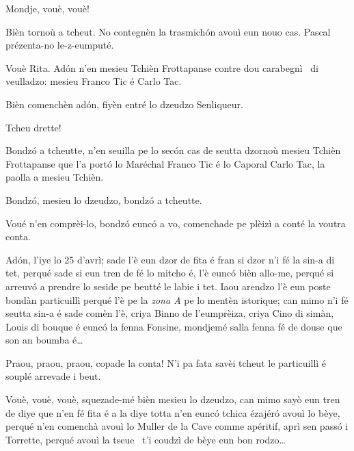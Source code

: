 \begin{drama}

 
\Ritaspeaks Mondje, vouè, vouè!


\Ritaspeaks Bièn tornoù a tcheut. No contegnèn la trasmichón avouì eun nouo cas. Pascal prézenta-no le-z-eumputé.

\Pascalspeaks Vouè Rita. Adón n'en mesieu Tchièn Frottapanse contre dou carabegnì \carabiniere\ di veulladzo: mesieu Franco Tic é Carlo Tac.


\Ritaspeaks Bièn comenchèn adón, fiyèn entré lo dzeudzo Senliqueur.


\Pascalspeaks Tcheu drette!


\DzeudzoSenliquerspeaks Bondzó a tcheutte, n'en seuilla pe lo secón cas de seutta dzornoù mesieu Tchièn Frottapanse que l'a portó lo Maréchal Franco Tic é lo Caporal Carlo Tac, la paolla a mesieu Tchièn.

\Cienspeaks Bondzó, mesieu lo dzeudzo, bondzó a tcheutte.

\DzeudzoSenliquerspeaks Voué n’en comprèi-lo, bondzó eunc\'o a vo, comenchade pe plèizì a conté la voutra conta.

\Cienspeaks Adón, l'iye lo 25 d’avrì; sade l'è eun dzor de fita é fran si dzor n’i fé la sin-a di tet, perqué sade si eun tren de fé lo mitcho é, l’è euncó bièn allo-me, perqué si arreuv\'o a prendre lo seside pe beutté le labie i tet. Iaou arendzo l’è eun poste bondàn particuillì perqué l’è pe la \textit{zona A} pe lo mentèn istorique; can mimo n’i fé seutta sin-a é sade comèn l’è, criya Binno de l'eumprèiza, criya Cino di simàn, Louis di bouque é euncó la fenna Fonsine, mondjemé salla fenna fé de douse que son an boumba é\ldots

\DzeudzoSenliquerspeaks {} Praou, praou, praou, copade la conta! N’i pa fata savèi tcheut le particuillì é souplé arrevade i beut.

\Cienspeaks Vouè, vouè, vouè, squezade-mé bièn mesieu lo dzeudzo, can mimo sayò eun tren de diye que n’en fé fita é a la diye totta n’en eunc\'o tchica ézajéró avouì lo bèye, perqué n’en comenchà avouì lo Muller de la Cave comme apéritif, aprì sen passó i Torrette, perqué avouì la tseue \carne\ t’i coudzì de bèye eun bon rodzo\ldots


\end{drama}

